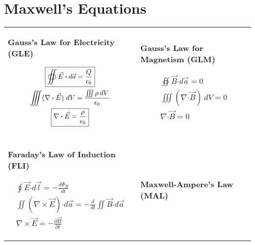 \documentclass[12pt]{article}
\newcommand{\hs}{\hspace{1pt}} %
\newcommand{\dotP}{\boldsymbol \cdot}		%
\begin{document}
\setlength{\parindent}{0pt}

\section{Maxwell's Equations}

\vspace{15pt}
{
\tabcolsep=0pt
\renewcommand{\arraystretch}{0}
\begin{tabular}{p{.49\linewidth} p{.49\linewidth}}
	{
		\textbf{Gauss's Law for Electricity (GLE)}
		
		\begin{gather*}
			\boxed{ \oiint \vec{E} \dotP d\vec{a} = \frac{Q}{\epsilon_0} }\\
			\iiint (\nabla \dotP \vec{E})\ dV = \frac{\iiint \hspace{-1pt} \rho\hs\hs dV}{\epsilon_0} \\
			\boxed{ \nabla \dotP \vec{E} = \frac{\rho}{\epsilon_0} }
		\end{gather*} 
	} &
	{
		\textbf{Gauss's Law for Magnetism (GLM)}

		\begin{gather*}
			\boxed{ \oiint \vec{B} \dotP d\vec{a} = 0 }\\
			\iiint (\nabla \dotP \vec{B} )\ dV = 0 \\
			\boxed{ \nabla \dotP \vec{B} = 0 }
		\end{gather*}
	} \\ \\[10pt]
	{
		\textbf{Faraday's Law of Induction (FLI)}

		\begin{gather*}
			\boxed{ \oint \vec{E} \dotP d\vec{l} = -\frac{d\Phi_B}{dt} }\\
			\iint (\nabla \times \vec{E}) \dotP d\vec{a} = -\frac{d}{dt} \iint \vec{B} \dotP d\vec{a} \\
			\boxed{ \nabla \times \vec{E} = -\frac{\partial \vec{B}}{\partial t} }
		\end{gather*}
	} &
	{
		\textbf{Maxwell-Ampere's Law (MAL)}

}
\end{tabular}}
\end{document}
